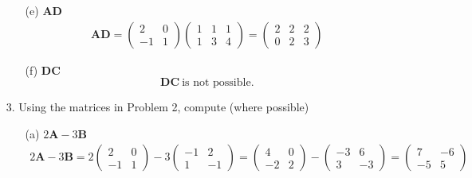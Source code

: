 \documentclass{article}
\begin{document}
\begin{enumerate}
\begin{enumerate}
            \item[(e)] $\mathbf{A}\mathbf{D}$
            \begin{align*}
                \mathbf{A}\mathbf{D}
                = \begin{pmatrix}2 &0\\-1 &1\end{pmatrix}
                  \begin{pmatrix}1 &1 &1\\1 &3 &4\end{pmatrix}
                = \begin{pmatrix}2 &2 &2\\0 &2 &3\end{pmatrix}
            \end{align*}
            \item[(f)] $\mathbf{D}\mathbf{C}$
            $$ \mathbf{D}\mathbf{C}\ \textrm{is not possible.}$$
            
        \end{enumerate}

    \item[3. ] Using the matrices in Problem 2, compute (where possible)
        \begin{enumerate}
            \item[(a)] $2\mathbf{A} - 3\mathbf{B}$
            \begin{align*}
                2\mathbf{A} - 3\mathbf{B}
                = 2\begin{pmatrix}2 &0\\-1 &1\end{pmatrix}
                - 3\begin{pmatrix}-1 &2\\1 &-1\end{pmatrix}
                = \begin{pmatrix}4 &0\\-2 &2\end{pmatrix}
                - \begin{pmatrix}-3 &6\\3 &-3\end{pmatrix}
                = \begin{pmatrix}7 &-6\\-5 &5\end{pmatrix}
            \end{align*}
            

\end{enumerate}
\end{enumerate}
\end{document}
